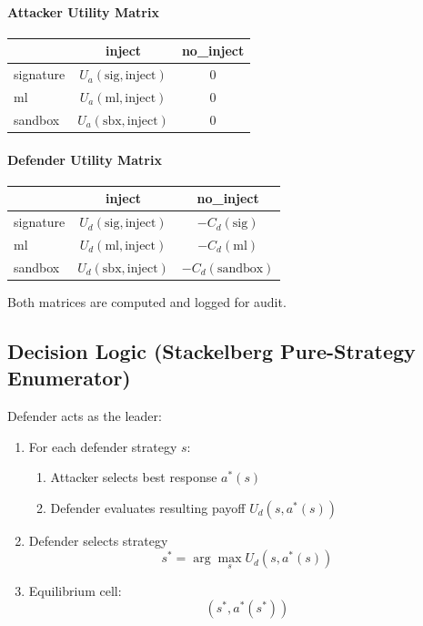 \documentclass[12pt, a4paper]{report}
\begin{document}
\paragraph{Attacker Utility Matrix}
\begin{table}[H]
\centering
\begin{tabular}{|l|c|c|}
\hline
 & inject & no\_inject \\
\hline
signature & $U_a(\text{sig},\text{inject})$ & 0 \\
\hline
ml & $U_a(\text{ml},\text{inject})$ & 0 \\
\hline
sandbox & $U_a(\text{sbx},\text{inject})$ & 0 \\
\hline
\end{tabular}
\end{table}

\paragraph{Defender Utility Matrix}
\begin{table}[H]
\centering
\begin{tabular}{|l|c|c|}
\hline
 & inject & no\_inject \\
\hline
signature & $U_d(\text{sig},\text{inject})$ & $-C_d(\text{sig})$ \\
\hline
ml & $U_d(\text{ml},\text{inject})$ & $-C_d(\text{ml})$ \\
\hline
sandbox & $U_d(\text{sbx},\text{inject})$ & $-C_d(\text{sandbox})$ \\
\hline
\end{tabular}
\end{table}

Both matrices are computed and logged for audit.

\subsection*{Decision Logic (Stackelberg Pure-Strategy Enumerator)}

Defender acts as the leader:

\begin{enumerate}
    \item For each defender strategy $s$:
    \begin{enumerate}
        \item Attacker selects best response $a^*(s)$
        \item Defender evaluates resulting payoff $U_d(s,a^*(s))$
    \end{enumerate}
    \item Defender selects strategy
    \[
    s^* = \arg\max_s U_d(s,a^*(s))
    \]
    \item Equilibrium cell:
    \[
    (s^*, a^*(s^*))
    \]
\end{enumerate}
\end{document}
